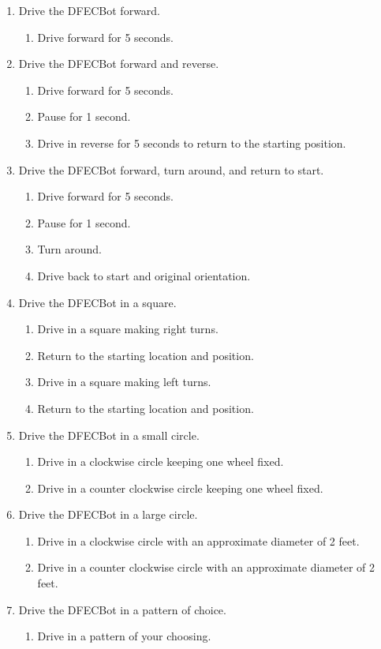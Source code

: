 \documentclass{handout}
\begin{document}
	\begin{enumerate}
		\item Drive the DFECBot forward.
		\begin{enumerate}
			\item Drive forward for 5 seconds.
		\end{enumerate}
		\item Drive the DFECBot forward and reverse.
		\begin{enumerate}
			\item Drive forward for 5 seconds.
			\item Pause for 1 second.
			\item Drive in reverse for 5 seconds to return to the starting position.
		\end{enumerate}
		\item Drive the DFECBot forward, turn around, and return to start.
		\begin{enumerate}
			\item Drive forward for 5 seconds.
			\item Pause for 1 second.
			\item Turn around.
			\item Drive back to start and original orientation.
		\end{enumerate}
		\item Drive the DFECBot in a square.
		\begin{enumerate}
			\item Drive in a square making right turns.
			\item Return to the starting location and position.
			\item Drive in a square making left turns.
			\item Return to the starting location and position.
		\end{enumerate}
		\item Drive the DFECBot in a small circle.
		\begin{enumerate}
			\item Drive in a clockwise circle keeping one wheel fixed.
			\item Drive in a counter clockwise circle keeping one wheel fixed.
		\end{enumerate}
		\item Drive the DFECBot in a large circle.
		\begin{enumerate}
			\item Drive in a clockwise circle with an approximate diameter of 2 feet.
			\item Drive in a counter clockwise circle with an approximate diameter of 2 feet.
		\end{enumerate}
		\item Drive the DFECBot in a pattern of choice.
		\begin{enumerate}
			\item Drive in a pattern of your choosing.
		\end{enumerate} 
	

\end{enumerate}


	
\end{document}
